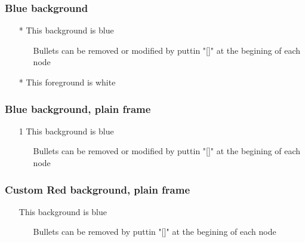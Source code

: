 \documentclass[usepdftitle=false,professionalfonts,compress ]{beamer}
\begin{document}
{

\begin{frame}\frametitle{Blue background}


	\begin{itemize}

	\item [*] This background is blue


	\begin{itemize}

	\item [] Bullets can be removed or modified by puttin "[]" at the begining of each node

				\end{itemize}

			\item [*] \color{white} This foreground is white

				\end{itemize}

\end{frame}
}





{

\begin{frame}[plain]\frametitle{Blue background, plain frame}


	\begin{itemize}

	\item [1] This background is blue


	\begin{itemize}

	\item [] Bullets can be removed or modified by puttin "[]" at the begining of each node

				\end{itemize}

				\end{itemize}

\end{frame}
}





{

\begin{frame}[plain]\frametitle{Custom Red background, plain frame}


	\begin{itemize}

	\item [] This background is blue


	\begin{itemize}

	\item [] Bullets can be removed by puttin "[]" at the begining of each node

				\end{itemize}

				\end{itemize}

\end{frame}
}
\end{document}
